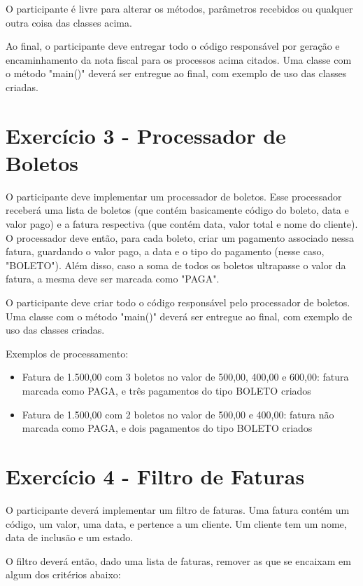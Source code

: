 O participante é livre para alterar os métodos, parâmetros recebidos ou qualquer outra coisa das classes acima.

Ao final, o participante deve entregar todo o código responsável por geração e encaminhamento da nota fiscal 
para os processos acima citados. Uma classe com o método "main()" deverá ser entregue ao final, com
exemplo de uso das classes criadas.

\section{Exercício 3 - Processador de Boletos}

O participante deve implementar um processador de boletos. Esse processador receberá uma lista de boletos 
(que contém basicamente código do boleto, data e valor pago) e a fatura respectiva (que contém data, valor total e nome do cliente). 
O processador deve então, para cada boleto, criar um pagamento associado nessa fatura,
guardando o valor pago, a data e o tipo do pagamento (nesse caso, "BOLETO").
Além disso, caso a soma de todos os boletos ultrapasse o valor da fatura, a mesma deve ser marcada
como "PAGA".

O participante deve criar todo o código responsável pelo processador de boletos. Uma classe com
o método "main()" deverá ser entregue ao final, com exemplo de uso das classes criadas.

Exemplos de processamento:

\begin{itemize}
	\item Fatura de 1.500,00 com 3 boletos no valor de 500,00, 400,00 e 600,00: fatura marcada como PAGA, e três pagamentos do tipo BOLETO criados 
	\item Fatura de 1.500,00 com 2 boletos no valor de 500,00 e 400,00: fatura não marcada como PAGA, e dois pagamentos do tipo BOLETO criados 
\end{itemize}

\section{Exercício 4 - Filtro de Faturas}

O participante deverá implementar um filtro de faturas. Uma fatura contém um código, um valor, uma data,
e pertence a um cliente. Um cliente tem um nome, data de inclusão e um estado.

O filtro deverá então, dado uma lista de faturas, remover as que se encaixam em algum dos critérios
abaixo:

